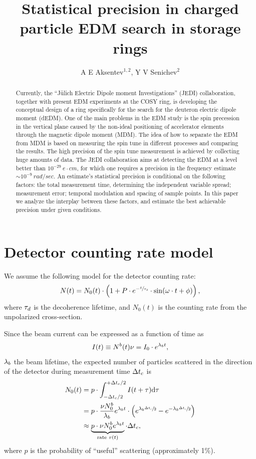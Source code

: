 \documentclass{jpconf}
\begin{document}
\title{Statistical precision in charged particle EDM search in storage rings}
\author{A E Aksentev$^{1,2}$, Y V Senichev$^2$}
\address{ $^1$ IKP, Forschungszentrum J\"ulich, J\"ulich, Germany}
\address{$^2$ National Research Nuclear University ``MEPhI,'' Moscow, Russia}


\begin{abstract}
	Currently, the ``J\"ulich Electric Dipole moment Investigations'' (JEDI) collaboration, together with present EDM experiments at the COSY ring, is developing the conceptual design of a ring specifically for the search for the deuteron electric dipole moment (dEDM). One of the main problems in the EDM study is the spin precession in the vertical plane caused by the non-ideal positioning of accelerator elements through the magnetic dipole moment (MDM). The idea of how to separate the EDM from MDM is based on measuring the spin tune in different processes and comparing the results.  The high precision of the spin tune measurement is achieved by collecting huge amounts of data. The JEDI collaboration aims at detecting the EDM at a level better than $10^{-29}~e\cdot cm$, for which one requires a precision in the frequency estimate $\sim10^{-9}~rad/sec$. An estimate's statistical precision is conditional on the following factors: the total measurement time, determining the independent variable spread; measurement error; temporal modulation and spacing of sample points. In this paper we analyze the interplay between these factors, and estimate the best achievable precision under given conditions.
\end{abstract}

\section{Detector counting rate model}
We assume the following model for the detector counting rate:
\begin{equation}\label{eq:DetCntRt}
	N(t) = N_0(t)\cdot\bkt{1 + P\cdot e^{-\sfrac{t}{\LTd}}\cdot\sin(\omega\cdot t + \phi)},
\end{equation}
where $\tau_d$ is the decoherence lifetime, and $N_0(t)$ is the counting rate from the unpolarized cross-section.

Since the beam current can be expressed as a function of time as 
\[
	I(t) \equiv N^b(t)\nu = I_0\cdot e^{\lambda_b t},
\]
$\lambda_b$ the beam lifetime, the expected number of particles scattered in the direction of the detector during measurement time $\Delta t_{c}$ is
\begin{align}
N_0(t) & = p\cdot\int_{-\dtc/2}^{+\dtc/2} I(t+\tau)\td\tau \notag                    \\
& = p\cdot\frac{\nu N_0^b}{\lamb} e^{\lamb t}\cdot \bkt{e^{\lamb\sfrac{\dtc}{2}} - e^{-\lamb\sfrac{\dtc}{2}}} \notag \\
& \approx \underbrace{p\cdot\nu N_0^b e^{\lamb t}}_{\text{rate}~r(t)} \cdot\dtc,
\end{align}
where $p$ is the probability of ``useful'' scattering (approximately 1\%).
\end{document}
